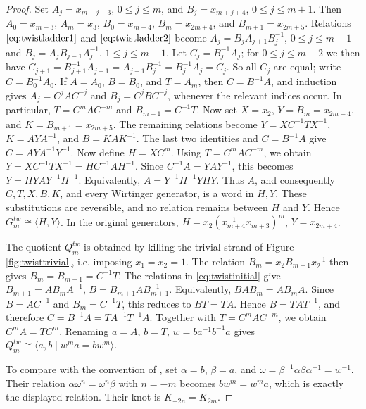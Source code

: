 \documentclass{article}
\theoremstyle{plain}
\theoremstyle{definition}
\theoremstyle{plain}
\theoremstyle{plain}
\theoremstyle{plain}
\theoremstyle{remark}
\theoremstyle{remark}
\theoremstyle{plain}
\theoremstyle{plain}
\newcounter{main}
\theoremstyle{plain}
\theoremstyle{plain}
\begin{document}
\begin{proof}
Set $A_j = x_{m-j+3}$, $0 \leq j \leq m$, and $B_j = x_{m+j+4}$, $0 \leq j \leq m+1$. Then $A_0 = x_{m+3}$, $A_m=x_3$, $B_0 = x_{m+4}$, $B_m = x_{2m+4}$, and $B_{m+1} = x_{2m+5}$. Relations $\eqref{eq:twistladder1}$ and $\eqref{eq:twistladder2}$ become $A_j = B_jA_{j+1}B_j^{-1}$, $0 \leq j \leq m - 1$ and $B_j = A_jB_{j-1}A_j^{-1}$, $1 \leq j \leq m - 1$. Let $C_j = B_j^{-1}A_j$; for $0 \leq j \leq m - 2$ we then have $C_{j+1} = B_{j+1}^{-1}A_{j+1} = A_{j+1}B_j^{-1} = B_j^{-1}A_j = C_j$. So all $C_j$ are equal; write $C = B_0^{-1}A_0$. If $A = A_0$, $B = B_0$, and $T = A_m$, then $C = B^{-1}A$, and induction gives $A_j = C^jAC^{-j}$ and $B_j = C^jBC^{-j}$, whenever the relevant indices occur. In particular, $T = C^mAC^{-m}$ and $B_{m-1} = C^{-1}T$. Now set $X = x_2$, $Y = B_m = x_{2m+4}$, and $K = B_{m+1} = x_{2m+5}$. The remaining relations become $Y = XC^{-1}TX^{-1}$, $K = AYA^{-1}$, and $B = KAK^{-1}$. The last two identities and $C=B^{-1}A$ give $C = AYA^{-1}Y^{-1}$. Now define $H = XC^m$. Using $T=C^mAC^{-m}$, we obtain $Y = XC^{-1}TX^{-1} = HC^{-1}AH^{-1}$. Since $C^{-1}A = YAY^{-1}$, this becomes $Y = HYAY^{-1}H^{-1}$. Equivalently, $A = Y^{-1}H^{-1}YHY$. Thus $A$, and consequently $C, T, X, B, K$, and every Wirtinger generator, is a word in $H, Y$. These substitutions are reversible, and no relation remains between $H$ and $Y$. Hence $G_m^{tw} \cong \langle H, Y \rangle$. In the original generators, $H = x_2(x_{m+4}^{-1}x_{m+3})^m$, $Y = x_{2m+4}$. 

\medskip

The quotient $Q_m^{tw}$ is obtained by killing the trivial strand of Figure \ref{fig:twisttrivial}, i.e. imposing $x_1 = x_2 = 1$. The relation $B_m = x_2B_{m-1}x_2^{-1}$ then gives $B_m = B_{m-1} = C^{-1}T$. The relations in \eqref{eq:twistinitial} give $B_{m+1} = AB_mA^{-1}$, $B = B_{m+1}AB_{m+1}^{-1}$. Equivalently, $BAB_m = AB_mA$. Since $B = AC^{-1}$ and $B_m = C^{-1}T$, this reduces to $BT = TA$. Hence $B = TAT^{-1}$, and therefore $C = B^{-1}A = TA^{-1}T^{-1}A$. Together with $T = C^mAC^{-m}$, we obtain $C^mA = TC^m$. Renaming $a = A$, $b = T$, $w = ba^{-1}b^{-1}a$ gives $Q_m^{tw} \cong \langle a, b \mid w^ma = bw^m \rangle$. 

\medskip

To compare with the convention of \cite{hosteshanahan}, set $\alpha=b$, $\beta = a$, and $\omega = \beta^{-1}\alpha\beta\alpha^{-1} = w^{-1}$. Their relation $\alpha\omega^n = \omega^n\beta$ with $n=-m$ becomes $bw^m = w^ma$, which is exactly the displayed relation. Their knot is $K_{-2n} = K_{2m}$. 
\end{proof}
\end{document}
